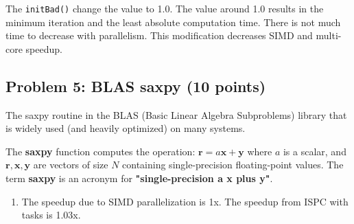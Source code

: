 \documentclass[letterpaper,11pt]{exam}
\begin{document}
\begin{questions}
\begin{enumerate}[label=\roman*.]
              The \texttt{initBad()} change the value to 1.0. The value around 1.0 results in the minimum iteration and the
              least absolute computation time. There is not much time to decrease with
              parallelism. This modification decreases SIMD and multi-core speedup.

    \end{enumerate}

    \newpage

    \question

    \subsection*{Problem 5: BLAS saxpy (10 points)}

    The saxpy routine in the BLAS (Basic Linear Algebra Subproblems) library that is
    widely used (and heavily optimized) on many systems.

    The \textbf{saxpy} function computes the operation:
    $\mathbf{r} = a \mathbf{x} + \mathbf{y}$
    where $a$ is a scalar, and $\mathbf{r}, \mathbf{x}, \mathbf{y}$ are vectors of size $N$ containing single-precision floating-point values.
    The term \textbf{saxpy} is an acronym for \textbf{"single-precision a x plus y"}.

    \begin{enumerate}[label=\roman*.]
        \item The speedup due to SIMD parallelization is 1x. The speedup from ISPC with tasks is 1.03x.


\end{enumerate}
\end{questions}
\end{document}
